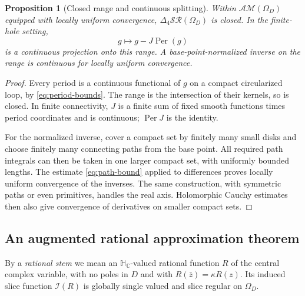 \documentclass[11pt,a4paper]{article}
\numberwithin{equation}{section}
\newtheorem{proposition}[theorem]{Proposition}
\theoremstyle{definition}
\theoremstyle{remark}
\newcommand{\C}{\mathbb C}
\newcommand{\HC}{\mathbb H_{\C}}
\newcommand{\SR}{\mathcal{SR}}
\newcommand{\AM}{\mathcal{AM}}
\newcommand{\cI}{\mathcal I}
\newcommand{\lap}{\Delta_4}
\newcommand{\Per}{\operatorname{Per}}
\begin{document}
\begin{proposition}[Closed range and continuous splitting]\label{prop:closed-range}
Within $\AM(\Omega_D)$ equipped with locally uniform convergence,
$\lap\SR(\Omega_D)$ is closed. In the finite-hole setting,
\[
 g\longmapsto g-J\Per(g)
\]
is a continuous projection onto this range. A base-point-normalized inverse
on the range is continuous for locally uniform convergence.
\end{proposition}
\begin{proof}
Every period is a continuous functional of $g$ on a compact circularized loop,
by \eqref{eq:period-bounds}. The range is the intersection of their kernels,
so is closed. In finite connectivity, $J$ is a finite sum of fixed smooth
functions times period coordinates and is continuous; $\Per J$ is the identity.

For the normalized inverse, cover a compact set by finitely many small disks
and choose finitely many connecting paths from the base point. All required
path integrals can then be taken in one larger compact set, with uniformly
bounded lengths. The estimate \eqref{eq:path-bound} applied to differences
proves locally uniform convergence of the inverses. The same construction,
with symmetric paths or even primitives, handles the real axis. Holomorphic
Cauchy estimates then also give convergence of derivatives on smaller compact
sets.
\end{proof}

\subsection{An augmented rational approximation theorem}
By a \emph{rational stem} we mean an $\HC$-valued rational function $R$ of the
central complex variable, with no poles in $D$ and with
$R(\bar z)=\kappa R(z)$. Its induced slice function $\cI(R)$ is globally
single valued and slice regular on $\Omega_D$.
\end{document}
